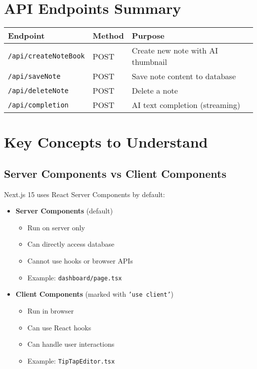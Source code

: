 \documentclass[11pt,a4paper]{article}
\begin{document}
\section{API Endpoints Summary}

\begin{table}[h]
\centering
\begin{tabular}{|l|l|p{6cm}|}
\hline
\textbf{Endpoint} & \textbf{Method} & \textbf{Purpose} \\
\hline
\texttt{/api/createNoteBook} & POST & Create new note with AI thumbnail \\
\hline
\texttt{/api/saveNote} & POST & Save note content to database \\
\hline
\texttt{/api/deleteNote} & POST & Delete a note \\
\hline
\texttt{/api/completion} & POST & AI text completion (streaming) \\
\hline
\end{tabular}
\end{table}


\section{Key Concepts to Understand}

\subsection{Server Components vs Client Components}

Next.js 15 uses React Server Components by default:

\begin{itemize}
    \item \textbf{Server Components} (default)
    \begin{itemize}
        \item Run on server only
        \item Can directly access database
        \item Cannot use hooks or browser APIs
        \item Example: \texttt{dashboard/page.tsx}
    \end{itemize}
    
    \item \textbf{Client Components} (marked with \texttt{'use client'})
    \begin{itemize}
        \item Run in browser
        \item Can use React hooks
        \item Can handle user interactions
        \item Example: \texttt{TipTapEditor.tsx}
    \end{itemize}
\end{itemize}
\end{document}
